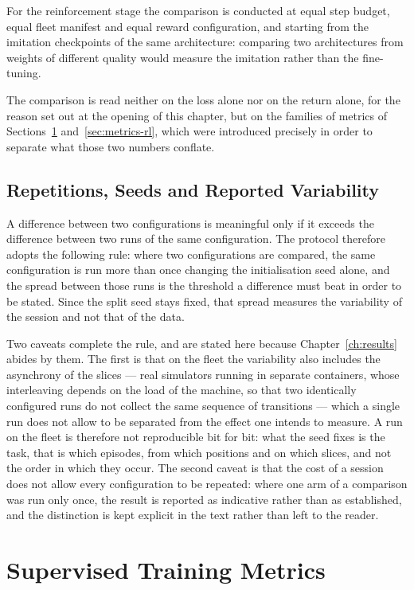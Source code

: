 For the reinforcement stage the comparison is conducted at equal step budget,
equal fleet manifest and equal reward configuration, and starting from the
imitation checkpoints of the same architecture: comparing two architectures from
weights of different quality would measure the imitation rather than the
fine-tuning.

The comparison is read neither on the loss alone nor on the return alone, for
the reason set out at the opening of this chapter, but on the families of
metrics of Sections~\ref{sec:metrics-supervised} and~\ref{sec:metrics-rl}, which
were introduced precisely in order to separate what those two numbers conflate.

\subsection{Repetitions, Seeds and Reported Variability}

A difference between two configurations is meaningful only if it exceeds the
difference between two runs of the same configuration. The protocol therefore
adopts the following rule: where two configurations are compared, the same
configuration is run more than once changing the initialisation seed alone, and
the spread between those runs is the threshold a difference must beat in order
to be stated. Since the split seed stays fixed, that spread measures the
variability of the session and not that of the data.

Two caveats complete the rule, and are stated here because
Chapter~\ref{ch:results} abides by them. The first is that on the fleet the
variability also includes the asynchrony of the slices --- real simulators
running in separate containers, whose interleaving depends on the load of the
machine, so that two identically configured runs do not collect the same
sequence of transitions --- which a single run does not allow to be separated
from the effect one intends to measure. A run on the fleet is therefore not
reproducible bit for bit: what the seed fixes is the task, that is which
episodes, from which positions and on which slices, and not the order in which
they occur. The second caveat is that the cost of a session does not allow every
configuration to be repeated: where one arm of a comparison was run only once,
the result is reported as indicative rather than as established, and the
distinction is kept explicit in the text rather than left to the reader.

\section{Supervised Training Metrics}
\label{sec:metrics-supervised}

